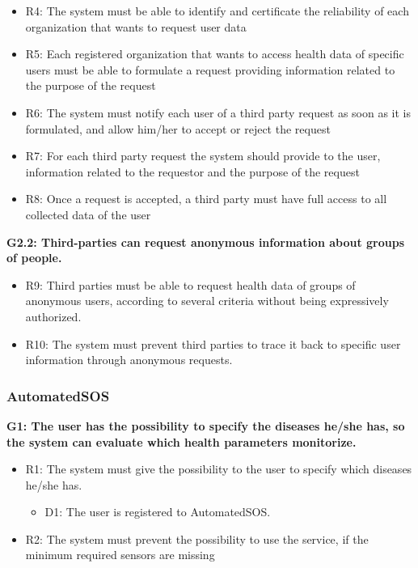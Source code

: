 \begin{itemize}
	\item R4: The system must be able to identify and certificate the reliability of each organization that wants to request user data
	\item R5: Each registered organization that wants to access health data of specific users must be able to formulate a request providing information related to the purpose of the request
	\item R6: The system must notify each user of a third party request as soon as it is formulated, and allow him/her to accept or reject the request
	\item R7: For each third party request the system should provide to the user, information related to the requestor and the purpose of the request
	\item R8: Once a request is accepted, a third party must have full access to all collected data of the user
\end{itemize}

\raggedright
\textbf{G2.2: Third-parties can request anonymous information about groups of people.}

\begin{itemize}
	\item R9: Third parties must be able to request health data of groups of anonymous users, according to several criteria without being expressively authorized.
	\item R10: The system must prevent third parties to trace it back to specific user information through anonymous requests.
\end{itemize}

{\color{Blue}\subsubsection{AutomatedSOS}}

\textbf{G1: The user has the possibility to specify the diseases he/she has, so the system can evaluate which health parameters monitorize.}

\begin{itemize}
	\item R1: The system must give the possibility to the user to specify which diseases he/she has.
	\begin{itemize}
		\item D1: The user is registered to AutomatedSOS.
	\end{itemize} 
	\item R2: The system must prevent the possibility to use the service, if the minimum required sensors are missing
\end{itemize}

